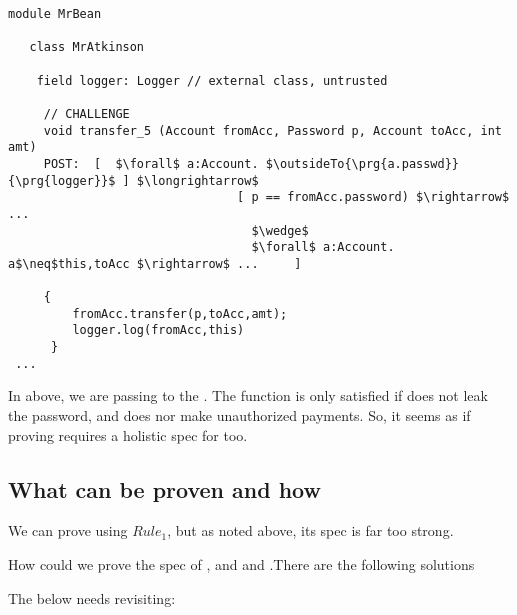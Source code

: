 \begin{lstlisting}[language=chainmail, mathescape=true, frame=lines]
module MrBean

   class MrAtkinson

    field logger: Logger // external class, untrusted

     // CHALLENGE 
     void transfer_5 (Account fromAcc, Password p, Account toAcc, int amt) 
     POST:  [  $\forall$ a:Account. $\outsideTo{\prg{a.passwd}}{\prg{logger}}$ ] $\longrightarrow$ 
                                [ p == fromAcc.password) $\rightarrow$ ...
                                  $\wedge$
                                  $\forall$ a:Account.  a$\neq$this,toAcc $\rightarrow$ ...     ]

     {   
         fromAcc.transfer(p,toAcc,amt);
         logger.log(fromAcc,this)
      }
 ...
\end{lstlisting}

In  above, we are passing   to the . The function  is
only satisfied if  does not leak the password, and does nor make unauthorized payments. So, 
it seems as if proving  requires a holistic spec for  too.

\subsection{What can be proven and how}

We can prove   using $Rule_1$, but as noted above, its spec is far too strong.

How could we prove the spec of , and  and  .There are the following solutions

\SP The below needs revisiting:


